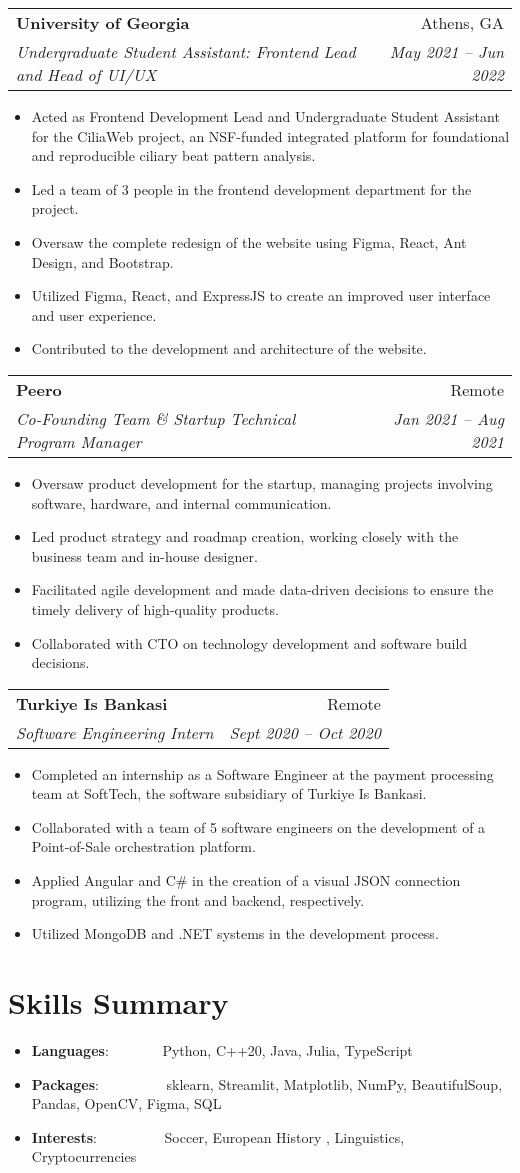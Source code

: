 \documentclass[a4paper,11pt]{extarticle}
\makeatletter
\newcommand{\resumeSkillItem}[2]{
	\item\small{
		\textbf{#1}{: #2 \vspace{-2pt}}
	}
}
\newcommand{\resumeItem}[1]{
	\item\small{
		#1 \vspace{-1.2pt}
	}
}
\newcommand{\resumeSubheading}[4]{
	\vspace{-1pt}
    \item
		\begin{tabular*}{1\linewidth}{l@{\extracolsep{\fill}}r}
			\textbf{#1} & #2 \\
			\textit{#3} & \textit{#4} \\
		\end{tabular*}\vspace{-2pt}
}
\newcommand{\resumeSubItem}[2]{\resumeSkillItem{#1}{#2}\vspace{-5pt}}
\newcommand{\resumeSubHeadingListStart}{
    \begin{itemize}[leftmargin=0.15in,label={}]}
\newcommand{\resumeSubHeadingListEnd}{\end{itemize}}
\newcommand{\resumeItemListStart}{\begin{itemize}\vspace{-3pt}}
\newcommand{\resumeItemListEnd}{\end{itemize}\vspace{-3pt}}
\makeatother
\begin{document}
   

     \resumeSubheading
            {University of Georgia}
            {Athens, GA}
            {Undergraduate Student Assistant: Frontend Lead and Head of UI/UX}
            {May 2021 -- Jun 2022}
            \resumeItemListStart
\resumeItem{Acted as Frontend Development Lead and Undergraduate Student Assistant for the CiliaWeb project, an NSF-funded integrated platform for foundational and reproducible ciliary beat pattern analysis.}
\resumeItem{Led a team of 3 people in the frontend development department for the project.}
\resumeItem{Oversaw the complete redesign of the website using Figma, React, Ant Design, and Bootstrap.}
\resumeItem{Utilized Figma, React, and ExpressJS to create an improved user interface and user experience.}
\resumeItem{Contributed to the development and architecture of the website.}
		\resumeItemListEnd   

     \resumeSubheading
            {Peero}
            {Remote}
            {Co-Founding Team \& Startup Technical Program Manager}
            {Jan 2021 -- Aug 2021}
		\resumeItemListStart
\resumeItem{Oversaw product development for the startup, managing projects involving software, hardware, and internal communication.}
\resumeItem{Led product strategy and roadmap creation, working closely with the business team and in-house designer.}
\resumeItem{Facilitated agile development and made data-driven decisions to ensure the timely delivery of high-quality products.}
\resumeItem{Collaborated with CTO on technology development and software build decisions.}

		\resumeItemListEnd
     \resumeSubheading
            {Turkiye Is Bankasi}
            {Remote}
            {Software Engineering Intern}
            {Sept 2020 -- Oct 2020}
		\resumeItemListStart
\resumeItem{Completed an internship as a Software Engineer at the payment processing team at SoftTech, the software subsidiary of Turkiye Is Bankasi.}
\resumeItem{Collaborated with a team of 5 software engineers on the development of a Point-of-Sale orchestration platform.}
\resumeItem{Applied Angular and C\# in the creation of a visual JSON connection program, utilizing the front and backend, respectively.}
\resumeItem{Utilized MongoDB and .NET systems in the development process.}
		\resumeItemListEnd
\section{Skills Summary}
	\resumeSubHeadingListStart
		\resumeSubItem{Languages}
            {\hspace{0.2mm}~~~~~~~Python, C++20, Java, Julia, TypeScript}
		\resumeSubItem{Packages}
            {\hspace{0.2mm}~~~~~~~~~sklearn, Streamlit, Matplotlib, NumPy, BeautifulSoup, Pandas, OpenCV, Figma, SQL}
            \resumeSubItem{Interests}
            {\hspace{0.2mm}~~~~~~~~~Soccer, European History , Linguistics, Cryptocurrencies}            
	\resumeSubHeadingListEnd
\end{document}

